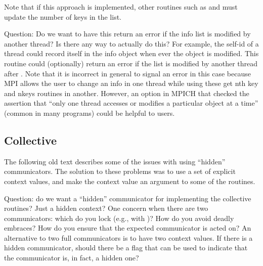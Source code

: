 \documentclass{article}
\begin{document}
Note that if this approach is implemented, other routines such as
 and  must update the number of keys
in the list.

Question:  Do we want to have this return an error if the info list is 
modified by another thread?  Is there any way to actually do this?  For
example, the self-id of a thread could record itself in the info object when
ever the object is modified.  This routine could (optionally) return an error
if the list is modified by another thread after .
Note that it is incorrect in general to signal an error in this case because
MPI allows the user to change an info in one thread while using these get nth
key and nkeys routines in another.  However, an option in MPICH that checked
the assertion that ``only one thread accesses or modifies a particular object
at a time'' (common in many programs) could be helpful to users.

\subsection{Collective}  

The following old text describes some of the issues with using
``hidden'' communicators.  The solution to these problems was to use a
set of explicit context values, and make the context value an argument
to some of the routines.

Question: do we want a ``hidden'' communicator for implementing the
collective routines?  Just a hidden context?  One concern when there
are two communicators: which do you lock (e.g., with
)?  How do you avoid deadly embraces?  How do
you 
ensure that the expected communicator is acted on?  An alternative to two full
communicators is to have two context values.  If there is a hidden
communicator, should there be a flag that can be used to indicate that the
communicator is, in fact, a hidden one?
\end{document}

